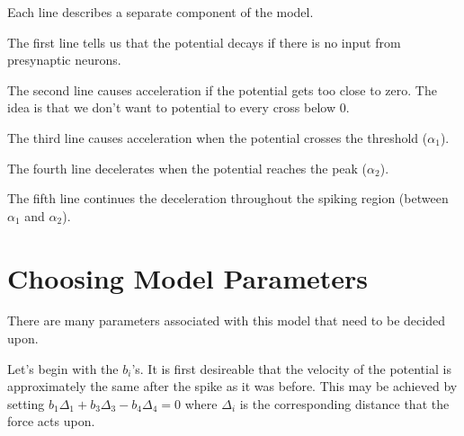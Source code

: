 \documentclass[a4paper]{article}
\begin{document}
Each line describes a separate component of the model. 

The first line tells us that the potential decays if there is no input from presynaptic neurons.

The second line causes acceleration if the potential gets too close to zero. The idea is that we don't want to potential to every cross below 0.

The third line causes acceleration when the potential crosses the threshold ($\alpha_1$).

The fourth line decelerates when the potential reaches the peak ($\alpha_2$).

The fifth line continues the deceleration throughout the spiking region (between $\alpha_1$ and $\alpha_2$).

\section{Choosing Model Parameters}

There are many parameters associated with this model that need to be decided upon.

Let's begin with the $b_i$'s. It is first desireable that the velocity of the potential is approximately the same after the spike as it was before. This may be achieved by setting $b_1 \Delta_1 + b_3 \Delta_3 - b_4 \Delta_4 = 0$ where $\Delta_i$ is the corresponding distance that the force acts upon.
\end{document}
